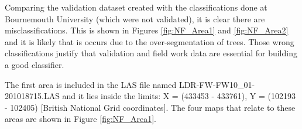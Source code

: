 \documentclass{subfiles}
\begin{document}
	   
	   \par Comparing the validation dataset created with the classifications done at Bournemouth University (which were not validated), it is clear there are misclassifications. This is shown in Figures \ref{fig:NF_Area1} and \ref{fig:NF_Area2} and it is likely that is occurs due to the over-segmentation of trees. Those wrong classifications justify that validation and field work data are essential for building a good classifier. 
	   
	   \newpage
	   \par The first area is included in the LAS file named LDR-FW-FW10\_01-201018715.LAS and it lies inside the limits:  X = (433453 - 433761), Y = (102193 - 102405) [British National Grid coordinates]. The four maps that relate to these areas are shown in Figure \ref{fig:NF_Area1}.
	   
\end{document}
